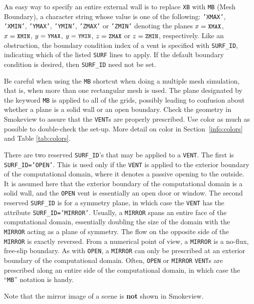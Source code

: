 \documentclass[11pt]{book}
\newcommand{\ct}{\tt\small}
\begin{document}
An easy way to specify an entire external wall is to replace {\ct XB} with
{\ct MB} (Mesh Boundary), a character string whose value is one of the following:
{\ct 'XMAX'}, {\ct 'XMIN'}, {\ct 'YMAX'}, {\ct 'YMIN'}, {\ct 'ZMAX'} or
{\ct 'ZMIN'} denoting the planes $x=\hbox{\ct XMAX}$, $x=\hbox{\ct XMIN}$,
$y=\hbox{\ct YMAX}$, $y=\hbox{\ct YMIN}$, $z=\hbox{\ct ZMAX}$
or $z=\hbox{\ct ZMIN}$, respectively.
Like an obstruction, the boundary condition index of a vent is specified
with {\ct SURF\_ID}, indicating which of the listed {\ct SURF} lines to
apply. If the default boundary condition is desired, then {\ct SURF\_ID} need not be set.

Be careful when using the {\ct MB} shortcut when doing a multiple mesh
simulation, that is, when more than one rectangular mesh is used. The
plane designated by the keyword {\ct MB} is applied to all of the
grids, possibly leading to confusion about whether a plane is a solid
wall or an open boundary. Check the geometry in Smokeview to assure that
the {\ct VENT}s are properly prescribed. Use color as much as
possible to double-check the set-up.  More detail on color in
Section~\ref{info:colors} and Table \ref{tab:colors}.

There are two reserved {\ct SURF\_ID}'s that may be applied to a {\ct VENT}.
The first is {\ct SURF\_ID='OPEN'}. This is used only if the {\ct VENT}
is applied to the exterior boundary of the computational domain, where
it denotes a passive opening to the outside. It is assumed here that
the exterior boundary of the computational domain is a solid wall, and
the {\ct OPEN} vent is essentially an open door or window.
The second reserved {\ct SURF\_ID} is for a symmetry plane, in which
case the {\ct VENT} has the attribute {\ct SURF\_ID='MIRROR'}.
Usually, a {\ct MIRROR} spans an entire face of the computational
domain, essentially doubling the size of the domain with the {\ct MIRROR}
acting as a plane of symmetry. The flow on the opposite side of the
{\ct MIRROR} is exactly reversed. From a numerical point of view,
a {\ct MIRROR} is a no-flux, free-slip boundary.
As with {\ct OPEN}, a {\ct MIRROR} can only be prescribed at an
exterior boundary of the computational domain.
Often, {\ct OPEN} or {\ct MIRROR} {\ct VENT}s are prescribed along an
entire side of the computational domain, in which case the ``{\ct MB}''
notation is handy.

\begin{warning}
\noindent
Note that the mirror image of a scene is {\bf not} shown in Smokeview.
\end{warning}
\end{document}
